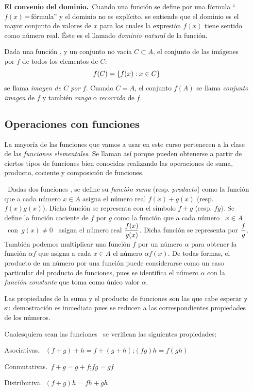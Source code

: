 \noindent \textbf{El convenio del dominio.}\ Cuando una función se
define por una fórmula ``$f(x)\,$=\,fórmula'' y el dominio no
es explícito, se entiende que el dominio es el mayor conjunto de valores
de $x$ para los cuales la expresión $f(x)$ tiene sentido como número
real. Éste es el llamado \emph{dominio natural} de la función.

Dada una función , y un conjunto no vacía $C\subset A$,
el conjunto de las imágenes por $f$ de todos los elementos de $C$:
\[
f(C)=\left\lbrace f(x):x\in C \right\rbrace
\]
se llama \emph{imagen de $C$ por $f$}. Cuando $C=A$, el conjunto
$f(A)$ se llama \emph{conjunto imagen} de $f$ y también \emph{rango}
o \emph{recorrido} de $f$. 

\subsection{Operaciones con funciones}

La mayoría de las funciones que vamos a usar en este curso pertenecen
a la clase de las \emph{funciones elementales}. Se llaman así porque
pueden obtenerse a partir de ciertos tipos de funciones bien conocidas
realizando las operaciones de suma, producto, cociente y composición
de funciones.

\ Dadas
dos funciones , se define su \emph{función suma}
(resp. \emph{producto}) como la función que a cada número $x\in A$
asigna el número real $f(x)+g(x)$ (resp. $f(x)g(x)$). Dicha función
se representa con el símbolo $f+g$ (resp. $fg$). Se define la función
cociente de $f$ por $g$ como la función que a cada número %
\mbox{%
$x\in A$ con $g(x)\neq0$%
} asigna el número real $\displaystyle\frac{f(x)}{g(x)}$. Dicha función se
representa por $\displaystyle\frac{f}{g}$. También podemos multiplicar una
función $f$ por un número $\alpha$ para obtener la función $\alpha f$
que asigna a cada $x\in A$ el número $\alpha f(x)$. De todas formas,
el producto de un número por una función puede considerarse como un
caso particular del producto de funciones, pues se identifica el número
$\alpha$ con la \emph{función constante} que toma como único valor
$\alpha$.

Las propiedades de la suma y el producto de funciones son las que
cabe esperar y su demostración es inmediata pues se reducen a las
correspondientes propiedades de los números. \begin{proposicion}{}{}
Cualesquiera sean las funciones \ se verifican
las siguientes propiedades:\par Asociativas. \ $(f+g)+h=f+(g+h)$;\quad{}$(fg)h=f(gh)$\par Conmutativas.\ $f+g=g+f$;\quad{}$fg=gf$\par Distributiva.\ $(f+g)h=fh+gh$
\end{proposicion}

